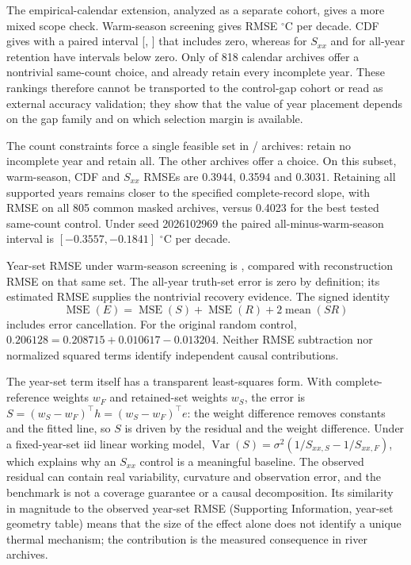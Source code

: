 \documentclass[draft,linenumbers]{agujournal2025}
\begin{document}
The empirical-calendar extension, analyzed as a separate cohort, gives a more mixed scope check. Warm-season screening gives RMSE \SRCalendarWarmRMSE{} $^{\circ}$C per decade. CDF gives \SRCalendarCDFRMSE{} with a paired interval [\SRCalendarCDFLow, \SRCalendarCDFHigh] that includes zero, whereas \SRCalendarSxxRMSE{} for $S_{xx}$ and \SRCalendarAllRMSE{} for all-year retention have intervals below zero. Only \SRCalendarChoiceN{} of 818 calendar archives offer a nontrivial same-count choice, and \SRCalendarAllKeptN{} already retain every incomplete year. These rankings therefore cannot be transported to the control-gap cohort or read as external accuracy validation; they show that the value of year placement depends on the gap family and on which selection margin is available.

The count constraints force a single feasible set in \PTRTimeIdenticalN{}/\PTRTimeN{} archives: \PTRTimeNoneKeptN{} retain no incomplete year and \PTRTimeAllKeptN{} retain all. The other \PTRTimeChoiceN{} archives offer a choice. On this subset, warm-season, CDF and $S_{xx}$ RMSEs are 0.3944, 0.3594 and 0.3031. Retaining all supported years remains closer to the specified complete-record slope, with RMSE \PTRTimeAllRMSE{} on all 805 common masked archives, versus 0.4023 for the best tested same-count control. Under seed 2026102969 the paired all-minus-warm-season interval is $[-0.3557,-0.1841]$ $^{\circ}$C per decade.

Year-set RMSE under warm-season screening is \PRTimeWarmTruthRMSE{}, compared with reconstruction RMSE \PRTimeWarmReconRMSE{} on that same set. The all-year truth-set error is zero by definition; its estimated RMSE supplies the nontrivial recovery evidence. The signed identity
\[
\operatorname{MSE}(E)=\operatorname{MSE}(S)+\operatorname{MSE}(R)+2\operatorname{mean}(SR)
\]
includes error cancellation. For the original random control, $0.206128=0.208715+0.010617-0.013204$. Neither RMSE subtraction nor normalized squared terms identify independent causal contributions.

The year-set term itself has a transparent least-squares form. With complete-reference weights $w_F$ and retained-set weights $w_S$, the error is $S=(w_S-w_F)^\top h=(w_S-w_F)^\top e$: the weight difference removes constants and the fitted line, so $S$ is driven by the residual and the weight difference. Under a fixed-year-set iid linear working model, $\operatorname{Var}(S)=\sigma^2(1/S_{xx,S}-1/S_{xx,F})$, which explains why an $S_{xx}$ control is a meaningful baseline. The observed residual can contain real variability, curvature and observation error, and the benchmark is not a coverage guarantee or a causal decomposition. Its similarity in magnitude to the observed year-set RMSE (Supporting Information, year-set geometry table) means that the size of the effect alone does not identify a unique thermal mechanism; the contribution is the measured consequence in river archives.
\end{document}
